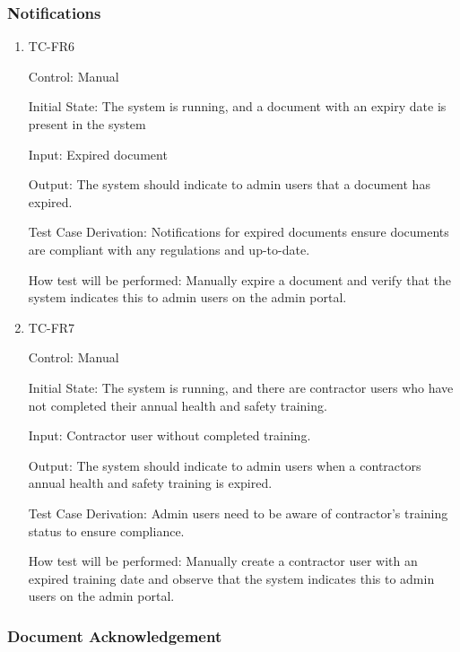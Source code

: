 \documentclass[12pt, titlepage]{article}
\begin{document}
\subsubsection{Notifications}

\begin{enumerate}
  \item {TC-FR6\\}

    Control: Manual

    Initial State: The system is running, and a document with an
    expiry date is present
    in the system

    Input: Expired document

    Output: The system should indicate to admin users that a document
    has expired.

    Test Case Derivation: Notifications for expired documents ensure
    documents are
    compliant with any regulations and up-to-date.

    How test will be performed: Manually expire a document and verify
    that the system indicates this to admin users on the admin portal.

  \item {TC-FR7\\}

    Control: Manual

    Initial State: The system is running, and there are contractor users who
    have not completed their annual health and safety training.

    Input: Contractor user without completed training.

    Output: The system should indicate to admin users when a
    contractors annual health and safety training is expired.

    Test Case Derivation: Admin users need to be aware of contractor's training
    status to ensure compliance.

    How test will be performed: Manually create a contractor user
    with an expired training date and observe that the system
    indicates this to admin users on the admin portal.

\end{enumerate}

\subsubsection{Document Acknowledgement}
\end{document}
